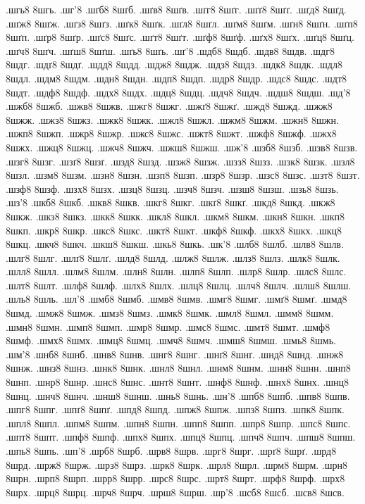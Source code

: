 {.шгь8 8шгь.
.шг'8
.шґб8 8шґб.
.шґв8 8шґв.
.шґг8 8шґг.
.шґґ8 8шґґ.
.шґд8 8шґд.
.шґж8 8шґж.
.шґз8 8шґз.
.шґк8 8шґк.
.шґл8 8шґл.
.шґм8 8шґм.
.шґн8 8шґн.
.шґп8 8шґп.
.шґр8 8шґр.
.шґс8 8шґс.
.шґт8 8шґт.
.шґф8 8шґф.
.шґх8 8шґх.
.шґц8 8шґц.
.шґч8 8шґч.
.шґш8 8шґш.
.шґь8 8шґь.
.шґ'8
.шдб8 8шдб.
.шдв8 8шдв.
.шдг8 8шдг.
.шдґ8 8шдґ.
.шдд8 8шдд.
.шдж8 8шдж.
.шдз8 8шдз.
.шдк8 8шдк.
.шдл8 8шдл.
.шдм8 8шдм.
.шдн8 8шдн.
.шдп8 8шдп.
.шдр8 8шдр.
.шдс8 8шдс.
.шдт8 8шдт.
.шдф8 8шдф.
.шдх8 8шдх.
.шдц8 8шдц.
.шдч8 8шдч.
.шдш8 8шдш.
.шд'8
.шжб8 8шжб.
.шжв8 8шжв.
.шжг8 8шжг.
.шжґ8 8шжґ.
.шжд8 8шжд.
.шжж8 8шжж.
.шжз8 8шжз.
.шжк8 8шжк.
.шжл8 8шжл.
.шжм8 8шжм.
.шжн8 8шжн.
.шжп8 8шжп.
.шжр8 8шжр.
.шжс8 8шжс.
.шжт8 8шжт.
.шжф8 8шжф.
.шжх8 8шжх.
.шжц8 8шжц.
.шжч8 8шжч.
.шжш8 8шжш.
.шж'8
.шзб8 8шзб.
.шзв8 8шзв.
.шзг8 8шзг.
.шзґ8 8шзґ.
.шзд8 8шзд.
.шзж8 8шзж.
.шзз8 8шзз.
.шзк8 8шзк.
.шзл8 8шзл.
.шзм8 8шзм.
.шзн8 8шзн.
.шзп8 8шзп.
.шзр8 8шзр.
.шзс8 8шзс.
.шзт8 8шзт.
.шзф8 8шзф.
.шзх8 8шзх.
.шзц8 8шзц.
.шзч8 8шзч.
.шзш8 8шзш.
.шзь8 8шзь.
.шз'8
.шкб8 8шкб.
.шкв8 8шкв.
.шкг8 8шкг.
.шкґ8 8шкґ.
.шкд8 8шкд.
.шкж8 8шкж.
.шкз8 8шкз.
.шкк8 8шкк.
.шкл8 8шкл.
.шкм8 8шкм.
.шкн8 8шкн.
.шкп8 8шкп.
.шкр8 8шкр.
.шкс8 8шкс.
.шкт8 8шкт.
.шкф8 8шкф.
.шкх8 8шкх.
.шкц8 8шкц.
.шкч8 8шкч.
.шкш8 8шкш.
.шкь8 8шкь.
.шк'8
.шлб8 8шлб.
.шлв8 8шлв.
.шлг8 8шлг.
.шлґ8 8шлґ.
.шлд8 8шлд.
.шлж8 8шлж.
.шлз8 8шлз.
.шлк8 8шлк.
.шлл8 8шлл.
.шлм8 8шлм.
.шлн8 8шлн.
.шлп8 8шлп.
.шлр8 8шлр.
.шлс8 8шлс.
.шлт8 8шлт.
.шлф8 8шлф.
.шлх8 8шлх.
.шлц8 8шлц.
.шлч8 8шлч.
.шлш8 8шлш.
.шль8 8шль.
.шл'8
.шмб8 8шмб.
.шмв8 8шмв.
.шмг8 8шмг.
.шмґ8 8шмґ.
.шмд8 8шмд.
.шмж8 8шмж.
.шмз8 8шмз.
.шмк8 8шмк.
.шмл8 8шмл.
.шмм8 8шмм.
.шмн8 8шмн.
.шмп8 8шмп.
.шмр8 8шмр.
.шмс8 8шмс.
.шмт8 8шмт.
.шмф8 8шмф.
.шмх8 8шмх.
.шмц8 8шмц.
.шмч8 8шмч.
.шмш8 8шмш.
.шмь8 8шмь.
.шм'8
.шнб8 8шнб.
.шнв8 8шнв.
.шнг8 8шнг.
.шнґ8 8шнґ.
.шнд8 8шнд.
.шнж8 8шнж.
.шнз8 8шнз.
.шнк8 8шнк.
.шнл8 8шнл.
.шнм8 8шнм.
.шнн8 8шнн.
.шнп8 8шнп.
.шнр8 8шнр.
.шнс8 8шнс.
.шнт8 8шнт.
.шнф8 8шнф.
.шнх8 8шнх.
.шнц8 8шнц.
.шнч8 8шнч.
.шнш8 8шнш.
.шнь8 8шнь.
.шн'8
.шпб8 8шпб.
.шпв8 8шпв.
.шпг8 8шпг.
.шпґ8 8шпґ.
.шпд8 8шпд.
.шпж8 8шпж.
.шпз8 8шпз.
.шпк8 8шпк.
.шпл8 8шпл.
.шпм8 8шпм.
.шпн8 8шпн.
.шпп8 8шпп.
.шпр8 8шпр.
.шпс8 8шпс.
.шпт8 8шпт.
.шпф8 8шпф.
.шпх8 8шпх.
.шпц8 8шпц.
.шпч8 8шпч.
.шпш8 8шпш.
.шпь8 8шпь.
.шп'8
.шрб8 8шрб.
.шрв8 8шрв.
.шрг8 8шрг.
.шрґ8 8шрґ.
.шрд8 8шрд.
.шрж8 8шрж.
.шрз8 8шрз.
.шрк8 8шрк.
.шрл8 8шрл.
.шрм8 8шрм.
.шрн8 8шрн.
.шрп8 8шрп.
.шрр8 8шрр.
.шрс8 8шрс.
.шрт8 8шрт.
.шрф8 8шрф.
.шрх8 8шрх.
.шрц8 8шрц.
.шрч8 8шрч.
.шрш8 8шрш.
.шр'8
.шсб8 8шсб.
.шсв8 8шсв.
}
